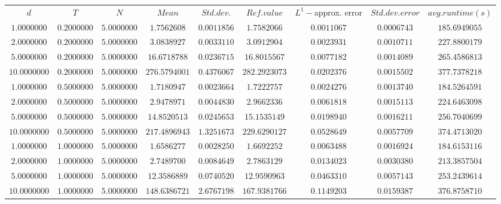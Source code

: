 \begin{tabular}{ccccccccc}
$d$ & $T$ & $N$ & $Mean$ & $Std. dev.$ & $Ref. value$ & $L^1-$approx. error & $Std. dev. error$ & $avg. runtime (s)$\\
$1.0000000$ & $0.2000000$ & $5.0000000$ & $1.7562608$ & $0.0011856$ & $1.7582066$ & $0.0011067$ & $0.0006743$ & $185.6949055$\\
$2.0000000$ & $0.2000000$ & $5.0000000$ & $3.0838927$ & $0.0033110$ & $3.0912904$ & $0.0023931$ & $0.0010711$ & $227.8800179$\\
$5.0000000$ & $0.2000000$ & $5.0000000$ & $16.6718788$ & $0.0236715$ & $16.8015567$ & $0.0077182$ & $0.0014089$ & $265.4586813$\\
$10.0000000$ & $0.2000000$ & $5.0000000$ & $276.5794001$ & $0.4376067$ & $282.2923073$ & $0.0202376$ & $0.0015502$ & $377.7378218$\\
$1.0000000$ & $0.5000000$ & $5.0000000$ & $1.7180947$ & $0.0023664$ & $1.7222757$ & $0.0024276$ & $0.0013740$ & $184.5264591$\\
$2.0000000$ & $0.5000000$ & $5.0000000$ & $2.9478971$ & $0.0044830$ & $2.9662336$ & $0.0061818$ & $0.0015113$ & $224.6463098$\\
$5.0000000$ & $0.5000000$ & $5.0000000$ & $14.8520513$ & $0.0245653$ & $15.1535149$ & $0.0198940$ & $0.0016211$ & $256.7040699$\\
$10.0000000$ & $0.5000000$ & $5.0000000$ & $217.4896943$ & $1.3251673$ & $229.6290127$ & $0.0528649$ & $0.0057709$ & $374.4713020$\\
$1.0000000$ & $1.0000000$ & $5.0000000$ & $1.6586277$ & $0.0028250$ & $1.6692252$ & $0.0063488$ & $0.0016924$ & $184.6153116$\\
$2.0000000$ & $1.0000000$ & $5.0000000$ & $2.7489700$ & $0.0084649$ & $2.7863129$ & $0.0134023$ & $0.0030380$ & $213.3857504$\\
$5.0000000$ & $1.0000000$ & $5.0000000$ & $12.3586889$ & $0.0740520$ & $12.9590963$ & $0.0463310$ & $0.0057143$ & $253.2439614$\\
$10.0000000$ & $1.0000000$ & $5.0000000$ & $148.6386721$ & $2.6767198$ & $167.9381766$ & $0.1149203$ & $0.0159387$ & $376.8758710$\\
\end{tabular}
